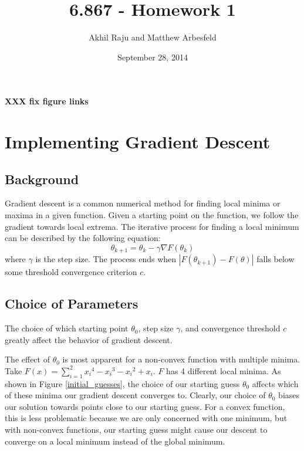 \documentclass[11pt]{article}   %
\theoremstyle{plain}
\begin{document}
\pagestyle{myheadings}          %
\title{6.867 - Homework 1}           %
\author{Akhil Raju and Matthew Arbesfeld}
\date{September 28, 2014}         %
\maketitle
\textbf{XXX fix figure links}

\section{Implementing Gradient Descent}

\subsection{Background}
Gradient descent is a common numerical method for finding local minima or maxima in a given function. Given a starting point on the function, we follow the gradient towards local extrema. The iterative process for finding a local minimum can be described by the following equation: \[\theta_{k+1} = \theta_k - \gamma \nabla F(\theta_k)\] where $\gamma$ is the step size. The process ends when $|F(\theta_{k+1}) - F(\theta)|$ falls below some threshold convergence criterion $c$. 

\subsection{Choice of Parameters}

The choice of which starting point $\theta_0$, step size $\gamma$, and convergence threshold $c$ greatly affect the behavior of gradient descent. 

The effect of $\theta_0$ is most apparent for a non-convex function with multiple minima. Take $F(x) = \sum\limits_{i=1}^{2} {x_i}^4 - {x_i}^3 - {x_i}^2 + x_i$. $F$ has 4 different local minima. As shown in Figure \ref{initial_guesses}, the choice of our starting guess $\theta_0$ affects which of these minima our gradient descent converges to. Clearly, our choice of $\theta_0$ biases our solution towards points close to our starting guess. For a convex function, this is less problematic because we are only concerned with one minimum, but with non-convex functions, our starting guess might cause our descent to converge on a local minimum instead of the global minimum.
\end{document}
